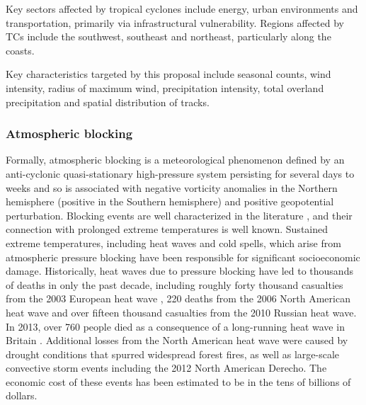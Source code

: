 \documentclass[11pt]{article}
\newcommand\citep{\cite}
\begin{document}

Key sectors affected by tropical cyclones include energy, urban environments and transportation, primarily via infrastructural vulnerability.  Regions affected by TCs include the southwest, southeast and northeast, particularly along the coasts.

Key characteristics targeted by this proposal include seasonal counts, wind intensity, radius of maximum wind, precipitation intensity, total overland precipitation and spatial distribution of tracks.

\subsubsection*{Atmospheric blocking}

Formally, atmospheric blocking is a meteorological phenomenon defined by an anti-cyclonic quasi-stationary high-pressure system persisting for several days to weeks and so is associated with negative vorticity anomalies in the Northern hemisphere (positive in the Southern hemisphere) and positive geopotential perturbation.  Blocking events are well characterized in the literature \citep{benzi1986anomalous}, and their connection with prolonged extreme temperatures is well known.  Sustained extreme temperatures, including heat waves and cold spells, which arise from atmospheric pressure blocking have been responsible for significant socioeconomic damage.  Historically, heat waves due to pressure blocking have led to thousands of deaths  in only the past decade, including roughly forty thousand casualties from the 2003 European heat wave \citep{bouchama20042003}, 220 deaths from the 2006 North American heat wave and over fifteen thousand casualties from the 2010 Russian heat wave.  In 2013, over 760 people died as a consequence of a long-running heat wave in Britain \citep{upi2013article}.  Additional losses from the North American heat wave were caused by drought conditions that spurred widespread forest fires, as well as large-scale convective storm events including the 2012 North American Derecho.  The economic cost of these events has been estimated to be in the tens of billions of dollars.

\end{document}
